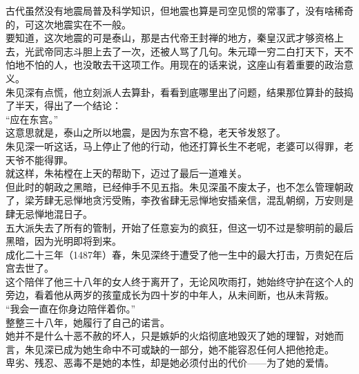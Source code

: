 \begin{multicols}{\theparacolNo}
古代虽然没有地震局普及科学知识，但地震也算是司空见惯的常事了，没有啥稀奇的，可这次地震实在不一般。\\

要知道，这次地震的可是泰山，那是古代帝王封禅的地方，秦皇汉武才够资格上去，光武帝同志斗胆上去了一次，还被人骂了几句。朱元璋一穷二白打天下，天不怕地不怕的人，也没敢去干这项工作。用现在的话来说，这座山有着重要的政治意义。\\

朱见深有点慌，他立刻派人去算卦，看看到底哪里出了问题，结果那位算卦的鼓捣了半天，得出了一个结论：\\

“应在东宫。”\\

这意思就是，泰山之所以地震，是因为东宫不稳，老天爷发怒了。\\

朱见深一听这话，马上停止了他的行动，他还打算长生不老呢，老婆可以得罪，老天爷不能得罪。\\

就这样，朱祐樘在上天的帮助下，迈过了最后一道难关。\\

但此时的朝政之黑暗，已经伸手不见五指。朱见深虽不废太子，也不怎么管理朝政了，梁芳肆无忌惮地贪污受贿，李孜省肆无忌惮地安插亲信，混乱朝纲，万安则是肆无忌惮地混日子。\\

五大派失去了所有的管制，开始了任意妄为的疯狂，但这一切不过是黎明前的最后黑暗，因为光明即将到来。\\

成化二十三年（1487年）春，朱见深终于遭受了他一生中的最大打击，万贵妃在后宫去世了。\\

这个陪伴了他三十八年的女人终于离开了，无论风吹雨打，她始终守护在这个人的旁边，看着他从两岁的孩童成长为四十岁的中年人，从未间断，也从未背叛。\\

“我会一直在你身边陪伴着你。”\\

整整三十八年，她履行了自己的诺言。\\

她并不是什么十恶不赦的坏人，只是嫉妒的火焰彻底地毁灭了她的理智，对她而言，朱见深已成为她生命中不可或缺的一部分，她不能容忍任何人把他抢走。\\

卑劣、残忍、恶毒不是她的本性，却是她必须付出的代价——为了她的爱情。\\


\end{multicols}
